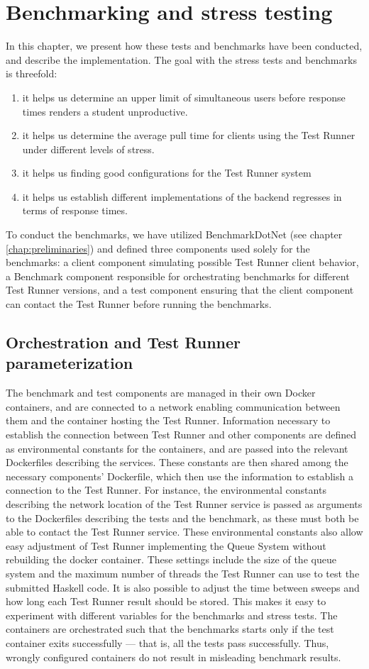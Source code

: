 \section{Benchmarking and stress testing} \label{chap:Benchmarking}
In this chapter, we present how these tests and benchmarks have been conducted, and describe the implementation. 
The goal with the stress tests and benchmarks is threefold: 
\begin{enumerate}
\item it helps us determine an upper limit of simultaneous users before response times renders a student unproductive.
\item it helps us determine the average pull time for clients using the Test Runner under different levels of stress.
\item it helps us finding good configurations for the Test Runner system
\item it helps us establish different implementations of the backend regresses in terms of response times.
\end{enumerate}
To conduct the benchmarks, we have utilized BenchmarkDotNet (see chapter \ref{chap:preliminaries}) and defined three components used solely for the benchmarks:
a client component simulating possible Test Runner client behavior, a Benchmark component responsible for orchestrating benchmarks for different Test Runner versions, and a test component ensuring that the client component can contact the Test Runner before running the benchmarks.

\subsection{Orchestration and Test Runner parameterization}
The benchmark and test components are managed in their own Docker containers, and are connected to a network enabling communication between them and the container hosting the Test Runner. 
Information necessary to establish the connection between Test Runner and other components are defined as environmental constants for the containers, and are passed into the relevant Dockerfiles describing the services.
These constants are then shared among the necessary components' Dockerfile, which then use the information to establish a connection to the Test Runner.
For instance, the environmental constants describing the network location of the Test Runner service is passed as arguments to the Dockerfiles describing the tests and the benchmark, as these must both be able to contact the Test Runner service.
These environmental constants also allow easy adjustment of Test Runner implementing the Queue System without rebuilding the docker container.
These settings include the size of the queue system and the maximum number of threads the Test Runner can use to test the submitted Haskell code. 
It is also possible to adjust the time between sweeps and how long each Test Runner result should be stored. 
This makes it easy to experiment with different variables for the benchmarks and stress tests.  
The containers are orchestrated such that the benchmarks starts only if the test container exits successfully --- that is, all the tests pass successfully. 
Thus, wrongly configured containers do not result in misleading benchmark results.

